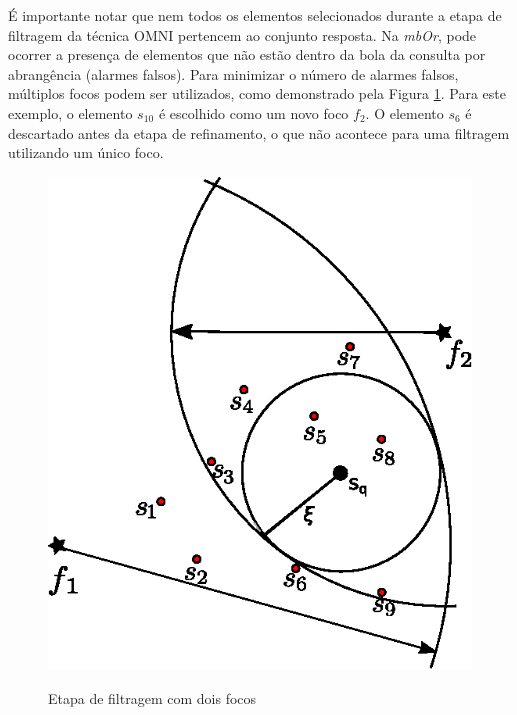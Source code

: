 É importante notar que nem todos os elementos selecionados durante a etapa de filtragem da técnica OMNI pertencem ao conjunto resposta. Na \textit{mbOr}, pode ocorrer a presença
de elementos que não estão dentro da bola da consulta por abrangência (alarmes falsos). Para minimizar o número de alarmes falsos, múltiplos focos podem ser utilizados, como demonstrado pela Figura \ref{fig:rgex3}.
Para este exemplo, o elemento $s_{10}$ é escolhido como um novo foco $f_2$. O elemento $s_6$ é descartado antes da etapa de refinamento, o que não acontece para uma filtragem utilizando um único foco.

\begin{figure}[H]
\centering
\caption{Etapa de filtragem com dois focos}
\includegraphics[width=.55\textwidth]{dados/figuras/rg_ex3.eps}
\label{fig:rgex3}
\end{figure}


